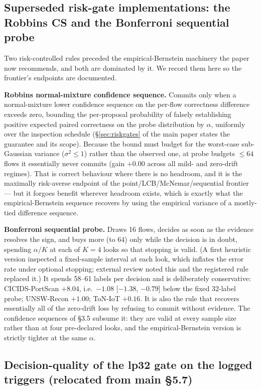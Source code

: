 \documentclass[a4paper,11pt]{article}
\makeatletter
\let\supp@subsection\subsection
\renewcommand{\subsection}{\FloatBarrier\supp@subsection}
\makeatother
\begin{document}
\subsection{Superseded risk-gate implementations: the Robbins CS and the Bonferroni sequential probe}

Two risk-controlled rules preceded the empirical-Bernstein machinery the paper now recommends,
and both are dominated by it. We record them here so the frontier's endpoints are documented.

\textbf{Robbins normal-mixture confidence sequence.} Commits only when a normal-mixture lower
confidence sequence on the per-flow correctness difference exceeds zero, bounding the
per-proposal probability of falsely establishing positive expected paired correctness on the
probe distribution by $\alpha$, uniformly over the inspection schedule (\S\ref{sec:riskgates} of the main
paper states the guarantee and its scope). Because the bound must budget for the worst-case
sub-Gaussian variance ($\sigma^2 \le 1$) rather than the observed one, at probe budgets
$\le 64$ flows it essentially never commits (gain $+0.00$ across all mild- and zero-drift
regimes). That is correct behaviour where there is no headroom, and it is the
maximally risk-averse endpoint of the point/LCB/McNemar/sequential frontier --- but it forgoes
benefit wherever headroom exists, which is exactly what the empirical-Bernstein sequence
recovers by using the empirical variance of a mostly-tied difference sequence.

\textbf{Bonferroni sequential probe.} Draws 16 flows, decides as soon as the evidence resolves
the sign, and buys more (to 64) only while the decision is in doubt, spending $\alpha/K$ at
each of $K{=}4$ looks so that stopping is valid. (A first heuristic version inspected a
fixed-sample interval at each look, which inflates the error rate under optional stopping;
external review noted this and the registered rule replaced it.) It spends 58--61 labels per
decision and is deliberately conservative: CICIDS-PortScan $+8.04$, i.e.\ $-1.08$
[$-1.38$, $-0.79$] below the fixed 32-label probe; UNSW-Recon $+1.00$; ToN-IoT $+0.16$. It is
also the rule that recovers essentially all of the zero-drift loss by refusing to commit
without evidence. The confidence sequences of \S3.5 subsume it: they are valid at every sample
size rather than at four pre-declared looks, and the empirical-Bernstein version is
strictly tighter at the same $\alpha$.

\subsection{Decision-quality of the lp32 gate on the logged triggers (relocated from main \S5.7)}
\end{document}
